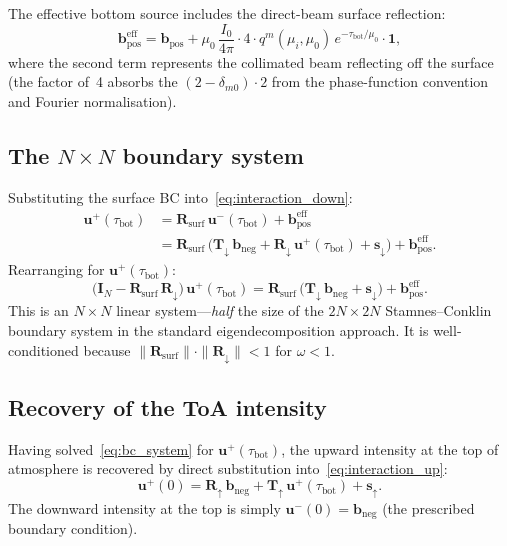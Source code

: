 \documentclass[11pt,a4paper]{article}
\newcommand{\vect}[1]{\bm{#1}}
\newcommand{\mat}[1]{\mathbf{#1}}
\newcommand{\tbot}{\tau_{\mathrm{bot}}}
\theoremstyle{definition}
\begin{document}
The effective bottom source includes the direct-beam surface
reflection:
\begin{equation}\label{eq:bpos_eff}
  \vect{b}_{\text{pos}}^{\text{eff}}
  = \vect{b}_{\text{pos}}
  + \mu_0\,\frac{I_0}{4\pi}\cdot 4\cdot
    q^m(\mu_i,\mu_0)\,e^{-\tbot/\mu_0}\cdot\vect{1},
\end{equation}
where the second term represents the collimated beam reflecting
off the surface (the factor of~4 absorbs the $(2-\delta_{m0})\cdot 2$
from the phase-function convention and Fourier normalisation).

\subsection{The $N\!\times\!N$ boundary system}

Substituting the surface BC into~\eqref{eq:interaction_down}:
\begin{align}
  \vect{u}^+(\tbot)
  &= \mat{R}_{\text{surf}}\,\vect{u}^-(\tbot)
   + \vect{b}_{\text{pos}}^{\text{eff}} \nonumber\\
  &= \mat{R}_{\text{surf}}\,
     \bigl(\mat{T}_\downarrow\,\vect{b}_{\text{neg}}
     + \mat{R}_\downarrow\,\vect{u}^+(\tbot)
     + \vect{s}_\downarrow\bigr)
   + \vect{b}_{\text{pos}}^{\text{eff}}.
\end{align}
Rearranging for $\vect{u}^+(\tbot)$:
\begin{equation}\label{eq:bc_system}
  \bigl(\mat{I}_N - \mat{R}_{\text{surf}}\,\mat{R}_\downarrow\bigr)\,
  \vect{u}^+(\tbot)
  = \mat{R}_{\text{surf}}\,
    \bigl(\mat{T}_\downarrow\,\vect{b}_{\text{neg}}
    + \vect{s}_\downarrow\bigr)
  + \vect{b}_{\text{pos}}^{\text{eff}}.
\end{equation}
This is an $N\!\times\!N$ linear system---\emph{half} the size
of the $2N\!\times\!2N$ Stamnes--Conklin boundary system in the
standard eigendecomposition approach.  It is well-conditioned because
$\|\mat{R}_{\text{surf}}\|\cdot\|\mat{R}_\downarrow\|<1$ for
$\omega<1$.

\subsection{Recovery of the ToA intensity}

Having solved~\eqref{eq:bc_system} for $\vect{u}^+(\tbot)$,
the upward intensity at the top of atmosphere is recovered by
direct substitution into~\eqref{eq:interaction_up}:
\begin{equation}\label{eq:recovery}
  \vect{u}^+(0)
  = \mat{R}_\uparrow\,\vect{b}_{\text{neg}}
  + \mat{T}_\uparrow\,\vect{u}^+(\tbot)
  + \vect{s}_\uparrow.
\end{equation}
The downward intensity at the top is simply
$\vect{u}^-(0)=\vect{b}_{\text{neg}}$ (the prescribed boundary
condition).
\end{document}
